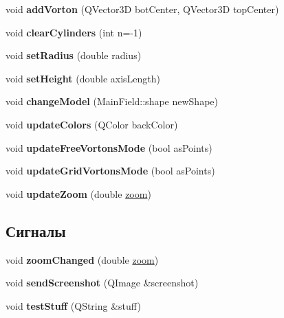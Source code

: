\begin{DoxyCompactItemize}
\item 
\mbox{\label{class_main_field_a4d42462e06f68a36c0490a84f5315137}} 
void {\bfseries add\+Vorton} (Q\+Vector3D bot\+Center, Q\+Vector3D top\+Center)
\item 
\mbox{\label{class_main_field_a29b60254314c2c55b3bc6e7447985fd1}} 
void {\bfseries clear\+Cylinders} (int n=-\/1)
\item 
\mbox{\label{class_main_field_a189ffdd0a7167ef22c255b8c9c8030c0}} 
void {\bfseries set\+Radius} (double radius)
\item 
\mbox{\label{class_main_field_ac9a588b17c54534bd3cfbcd6c3229aa8}} 
void {\bfseries set\+Height} (double axis\+Length)
\item 
\mbox{\label{class_main_field_a5eb411b5166bdd966d2cf8174b94f0be}} 
void {\bfseries change\+Model} (Main\+Field\+::shape new\+Shape)
\item 
\mbox{\label{class_main_field_af698356309479ee12c1e4356dc037d13}} 
void {\bfseries update\+Colors} (Q\+Color back\+Color)
\item 
\mbox{\label{class_main_field_a2940cc5504007343618953377fcf2374}} 
void {\bfseries update\+Free\+Vortons\+Mode} (bool as\+Points)
\item 
\mbox{\label{class_main_field_a0de645c649e8aece6a7624f362d606fb}} 
void {\bfseries update\+Grid\+Vortons\+Mode} (bool as\+Points)
\item 
\mbox{\label{class_main_field_a85954fc5438b2987e7e20559938da878}} 
void {\bfseries update\+Zoom} (double \mbox{\hyperlink{class_main_field_a6aaab00c15ffb70fff91f8ecb080121c}{zoom}})
\end{DoxyCompactItemize}
\subsection*{Сигналы}
\begin{DoxyCompactItemize}
\item 
\mbox{\label{class_main_field_adbfd839312a483a418d69105f518f1fd}} 
void {\bfseries zoom\+Changed} (double \mbox{\hyperlink{class_main_field_a6aaab00c15ffb70fff91f8ecb080121c}{zoom}})
\item 
\mbox{\label{class_main_field_a0a58d661df125d1a4cd0867347f0429f}} 
void {\bfseries send\+Screenshot} (Q\+Image \&screenshot)
\item 
\mbox{\label{class_main_field_a32c529cef206219696f0235f63b4c639}} 
void {\bfseries test\+Stuff} (Q\+String \&stuff)
\end{DoxyCompactItemize}
